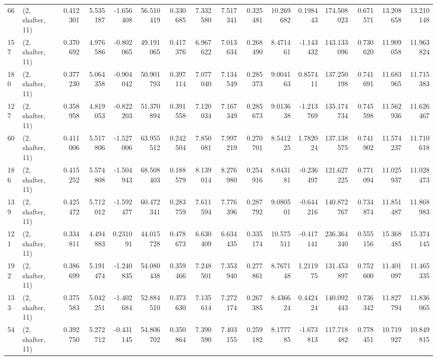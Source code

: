 \begin{tabular}{llrrrrrrrrrrrrrr}
66  &  (2, shafter, 11) &   0.412301 &   5.535187 &  -1.656408 &    56.510419 &   0.330685 &   7.332580 &   7.517341 &  0.325481 &  10.269682 &   0.198443 &   174.508023 &   0.671571 &  13.208658 &  13.210148 \\
157 &  (2, shafter, 11) &   0.370692 &   4.976586 &  -0.802065 &    49.191065 &   0.417376 &   6.967622 &   7.013634 &  0.268490 &   8.471461 &  -1.143432 &   143.133096 &   0.730620 &  11.909058 &  11.963824 \\
180 &  (2, shafter, 11) &   0.377230 &   5.064358 &  -0.904042 &    50.901793 &   0.397114 &   7.077040 &   7.134549 &  0.285373 &   9.004163 &   0.857411 &   137.250198 &   0.741691 &  11.683965 &  11.715383 \\
127 &  (2, shafter, 11) &   0.358958 &   4.819053 &  -0.822203 &    51.370894 &   0.391558 &   7.120034 &   7.167349 &  0.285673 &   9.013638 &  -1.213769 &   135.174734 &   0.745598 &  11.562936 &  11.626467 \\
60  &  (2, shafter, 11) &   0.411006 &   5.517806 &  -1.527006 &    63.955512 &   0.242504 &   7.850081 &   7.997219 &  0.270701 &   8.541225 &   1.782024 &   137.138575 &   0.741902 &  11.574237 &  11.710618 \\
186 &  (2, shafter, 11) &   0.415252 &   5.574808 &  -1.504943 &    68.508403 &   0.188579 &   8.139014 &   8.276980 &  0.254916 &   8.043181 &  -0.236497 &   121.627225 &   0.771094 &  11.025937 &  11.028473 \\
139 &  (2, shafter, 11) &   0.425472 &   5.712012 &  -1.592477 &    60.472341 &   0.283759 &   7.611594 &   7.776396 &  0.287792 &   9.080501 &  -0.644216 &   140.872767 &   0.734874 &  11.851487 &  11.868983 \\
121 &  (2, shafter, 11) &   0.334811 &   4.494883 &   0.231091 &    44.015728 &   0.478673 &   6.630409 &   6.634435 &  0.335174 &  10.575511 &  -0.417141 &   236.364340 &   0.555156 &  15.368485 &  15.374145 \\
192 &  (2, shafter, 11) &   0.386699 &   5.191474 &  -1.240835 &    54.080438 &   0.359466 &   7.248501 &   7.353940 &  0.277861 &   8.767148 &   1.211975 &   131.453897 &   0.752600 &  11.401097 &  11.465335 \\
133 &  (2, shafter, 11) &   0.375583 &   5.042251 &  -1.402684 &    52.884510 &   0.373630 &   7.135614 &   7.272174 &  0.267385 &   8.436624 &   0.442424 &   140.092443 &   0.736342 &  11.827794 &  11.836065 \\
54  &  (2, shafter, 11) &   0.392750 &   5.272712 &  -0.431145 &    54.806702 &   0.350864 &   7.390590 &   7.403155 &  0.259182 &   8.177785 &  -1.673813 &   117.718482 &   0.778451 &  10.719927 &  10.849815 \\

\end{tabular}

